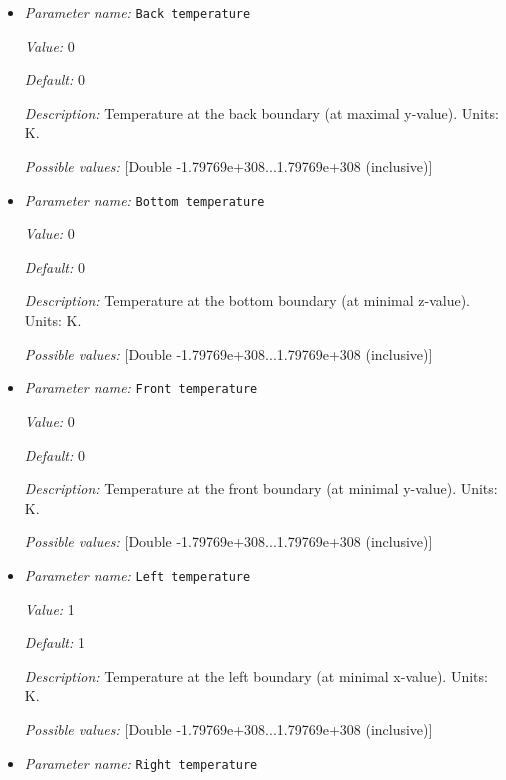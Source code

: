 \begin{itemize}
\item {\it Parameter name:} {\tt Back temperature}
\label{parameters:Boundary temperature model/Box/Back temperature}


{\it Value:} 0


{\it Default:} 0


{\it Description:} Temperature at the back boundary (at maximal y-value). Units: K.


{\it Possible values:} [Double -1.79769e+308...1.79769e+308 (inclusive)]
\item {\it Parameter name:} {\tt Bottom temperature}
\label{parameters:Boundary temperature model/Box/Bottom temperature}


{\it Value:} 0


{\it Default:} 0


{\it Description:} Temperature at the bottom boundary (at minimal z-value). Units: K.


{\it Possible values:} [Double -1.79769e+308...1.79769e+308 (inclusive)]
\item {\it Parameter name:} {\tt Front temperature}
\label{parameters:Boundary temperature model/Box/Front temperature}


{\it Value:} 0


{\it Default:} 0


{\it Description:} Temperature at the front boundary (at minimal y-value). Units: K.


{\it Possible values:} [Double -1.79769e+308...1.79769e+308 (inclusive)]
\item {\it Parameter name:} {\tt Left temperature}
\label{parameters:Boundary temperature model/Box/Left temperature}


{\it Value:} 1


{\it Default:} 1


{\it Description:} Temperature at the left boundary (at minimal x-value). Units: K.


{\it Possible values:} [Double -1.79769e+308...1.79769e+308 (inclusive)]
\item {\it Parameter name:} {\tt Right temperature}
\label{parameters:Boundary temperature model/Box/Right temperature}



\end{itemize}
